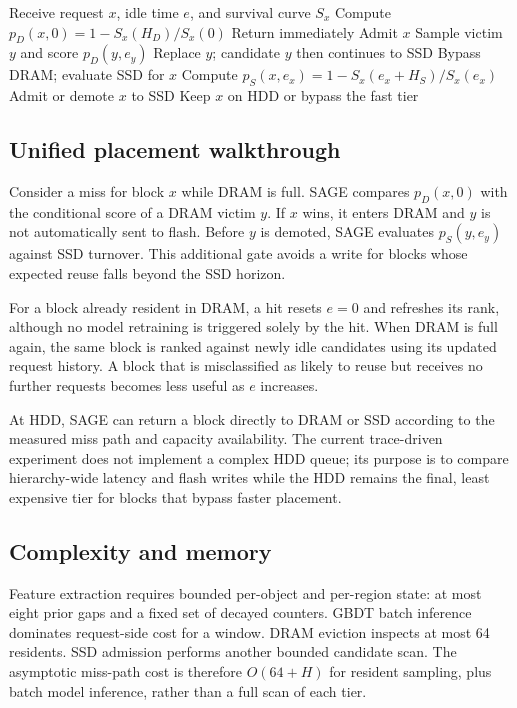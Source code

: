 \documentclass[conference]{IEEEtran}
\begin{document}
\begin{algorithm}[t]
\caption{Unified tier placement}
\label{alg:place}
\begin{algorithmic}[1]
\State Receive request $x$, idle time $e$, and survival curve $S_x$
\State Compute $p_D(x,0)=1-S_x(H_D)/S_x(0)$
  \State Return immediately
  \State Admit $x$
\Else
  \State Sample victim $y$ and score $p_D(y,e_y)$
    \State Replace $y$; candidate $y$ then continues to SSD
  \Else
    \State Bypass DRAM; evaluate SSD for $x$
  \EndIf
\EndIf
\State Compute $p_S(x,e_x)=1-S_x(e_x+H_S)/S_x(e_x)$
  \State Admit or demote $x$ to SSD
\Else
  \State Keep $x$ on HDD or bypass the fast tier
\EndIf
\end{algorithmic}
\end{algorithm}

\subsection{Unified placement walkthrough}
Consider a miss for block $x$ while DRAM is full. SAGE compares $p_D(x,0)$ with the conditional score of a DRAM victim $y$. If $x$ wins, it enters DRAM and $y$ is not automatically sent to flash. Before $y$ is demoted, SAGE evaluates $p_S(y,e_y)$ against SSD turnover. This additional gate avoids a write for blocks whose expected reuse falls beyond the SSD horizon.

For a block already resident in DRAM, a hit resets $e=0$ and refreshes its rank, although no model retraining is triggered solely by the hit. When DRAM is full again, the same block is ranked against newly idle candidates using its updated request history. A block that is misclassified as likely to reuse but receives no further requests becomes less useful as $e$ increases.

At HDD, SAGE can return a block directly to DRAM or SSD according to the measured miss path and capacity availability. The current trace-driven experiment does not implement a complex HDD queue; its purpose is to compare hierarchy-wide latency and flash writes while the HDD remains the final, least expensive tier for blocks that bypass faster placement.

\subsection{Complexity and memory}
Feature extraction requires bounded per-object and per-region state: at most eight prior gaps and a fixed set of decayed counters. GBDT batch inference dominates request-side cost for a window. DRAM eviction inspects at most 64 residents. SSD admission performs another bounded candidate scan. The asymptotic miss-path cost is therefore $O(64+H)$ for resident sampling, plus batch model inference, rather than a full scan of each tier.
\end{document}
